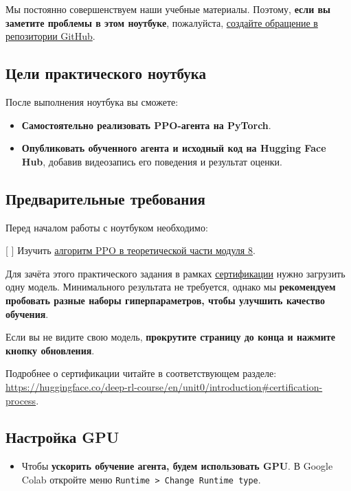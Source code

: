 \documentclass[11pt,a4paper]{article}
\begin{document}
Мы постоянно совершенствуем наши учебные материалы. Поэтому, \textbf{если вы заметите проблемы в этом ноутбуке}, пожалуйста, \href{https://github.com/huggingface/deep-rl-class/issues}{создайте обращение в репозитории GitHub}.

\subsection{Цели практического ноутбука}\label{objectives-of-this-notebook}

После выполнения ноутбука вы сможете:

\begin{itemize}
\tightlist
\item
  \textbf{Самостоятельно реализовать PPO-агента на PyTorch}.
\item
  \textbf{Опубликовать обученного агента и исходный код на Hugging Face Hub}, добавив видеозапись его поведения и результат оценки.
\end{itemize}

\subsection{Предварительные требования}\label{prerequisites}

Перед началом работы с ноутбуком необходимо:

{[} {]} Изучить \href{https://huggingface.co/deep-rl-course/unit8/introduction}{алгоритм PPO в теоретической части модуля 8}.

Для зачёта этого практического задания в рамках \href{https://huggingface.co/deep-rl-course/en/unit0/introduction\#certification-process}{сертификации} нужно загрузить одну модель. Минимального результата не требуется, однако мы \textbf{рекомендуем пробовать разные наборы гиперпараметров, чтобы улучшить качество обучения}.

Если вы не видите свою модель, \textbf{прокрутите страницу до конца и нажмите кнопку обновления}.

Подробнее о сертификации читайте в соответствующем разделе: \url{https://huggingface.co/deep-rl-course/en/unit0/introduction#certification-process}.

\subsection{Настройка GPU}\label{set-the-gpu}

\begin{itemize}
\tightlist
\item
  Чтобы \textbf{ускорить обучение агента, будем использовать GPU}. В Google Colab откройте меню \texttt{Runtime\ \textgreater{}\ Change\ Runtime\ type}.
\end{itemize}
\end{document}
